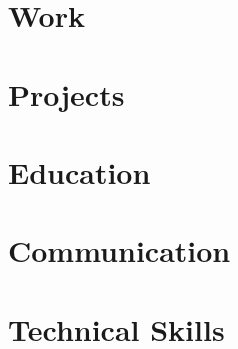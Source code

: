 \documentclass[12pt, a4paper, sans]{moderncv}
\begin{document}
\maketitle

\section{Work}

    

\section{Projects}

    

\section{Education}

    

\pagebreak

\section{Communication}

    

\section{Technical Skills}

    
\end{document}
